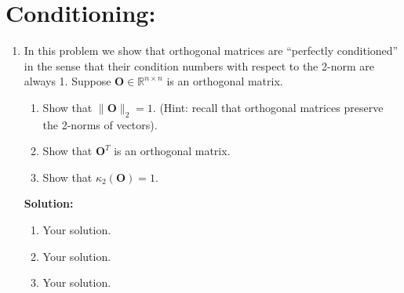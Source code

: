 \documentclass[]{article}
\newcommand{\R}{\mathbb{R}}				%
\newcommand{\solution}{\vskip 0.5cm \textbf{\large Solution:} \\}
\begin{document}
    \section*{Conditioning:}
    \begin{enumerate}[resume]
	\item In this problem we show that orthogonal matrices are ``perfectly conditioned'' in the sense that their condition numbers with respect to the 2-norm are always 1. Suppose $\bm{O}\in\R^{n\times n}$ is an orthogonal matrix.
	  \begin{enumerate}
	  \item Show that $\|\bm{O}\|_2=1$. (Hint: recall that orthogonal matrices preserve the 2-norms of vectors).
	  \item Show that $\bm{O}^T$ is an orthogonal matrix.
	  \item Show that $\kappa_2(\bm{O})=1$.
	  \end{enumerate}

	  \solution
	  \begin{enumerate}
	  \item Your solution.
	  \item Your solution.
	  \item Your solution.
	  \end{enumerate}
    \end{enumerate}
\end{document}
